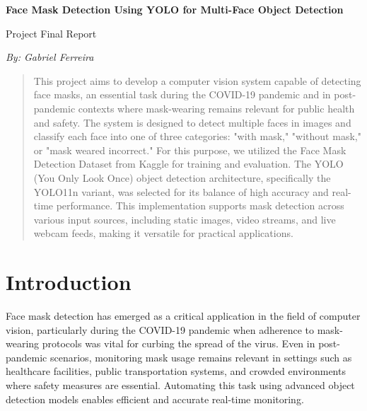\documentclass[11pt]{article}
\begin{document}
\begin{center}
{\Large \textbf{Face Mask Detection Using YOLO for Multi-Face Object Detection}

\vspace{10pt}

Project Final Report}

\vspace{10pt}

\textit{By: Gabriel Ferreira}
\end{center}




\begin{abstract} 
This project aims to develop a computer vision system capable of detecting face masks, an essential task during the COVID-19 pandemic and in post-pandemic contexts where mask-wearing remains relevant for public health and safety. The system is designed to detect multiple faces in images and classify each face into one of three categories: "with mask," "without mask," or "mask weared incorrect." For this purpose, we utilized the Face Mask Detection Dataset from Kaggle for training and evaluation. The YOLO (You Only Look Once) object detection architecture, specifically the YOLO11n variant, was selected for its balance of high accuracy and real-time performance. This implementation supports mask detection across various input sources, including static images, video streams, and live webcam feeds, making it versatile for practical applications. 
\end{abstract}


\section{Introduction} 

Face mask detection has emerged as a critical application in the field of computer vision, particularly during the COVID-19 pandemic when adherence to mask-wearing protocols was vital for curbing the spread of the virus. Even in post-pandemic scenarios, monitoring mask usage remains relevant in settings such as healthcare facilities, public transportation systems, and crowded environments where safety measures are essential. Automating this task using advanced object detection models enables efficient and accurate real-time monitoring.
\end{document}

